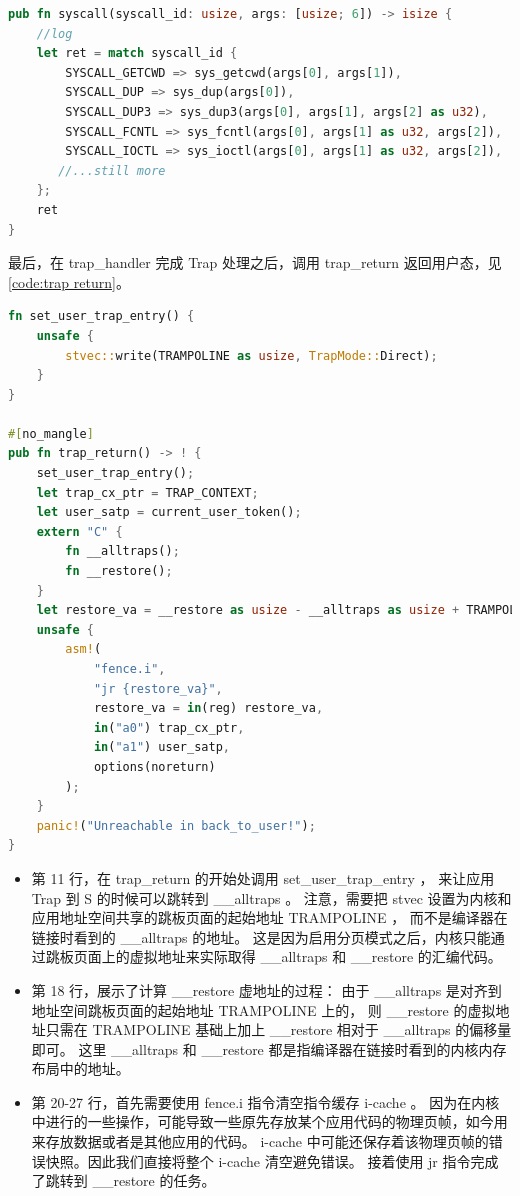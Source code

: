 \begin{lstlisting}[language={Rust}, label={code:syscall},
    caption={syscall}]
pub fn syscall(syscall_id: usize, args: [usize; 6]) -> isize {
	//log
    let ret = match syscall_id {
        SYSCALL_GETCWD => sys_getcwd(args[0], args[1]),
        SYSCALL_DUP => sys_dup(args[0]),
        SYSCALL_DUP3 => sys_dup3(args[0], args[1], args[2] as u32),
        SYSCALL_FCNTL => sys_fcntl(args[0], args[1] as u32, args[2]),
        SYSCALL_IOCTL => sys_ioctl(args[0], args[1] as u32, args[2]),
       //...still more
    };
    ret
}
\end{lstlisting}

最后，在 trap_handler 完成 Trap 处理之后，调用 trap_return 返回用户态，见\autoref{code:trap return}。

\begin{lstlisting}[language={Rust}, label={code:trap return},
    caption={trap_return}]
fn set_user_trap_entry() {
    unsafe {
        stvec::write(TRAMPOLINE as usize, TrapMode::Direct);
    }
}

#[no_mangle]
pub fn trap_return() -> ! {
    set_user_trap_entry();
    let trap_cx_ptr = TRAP_CONTEXT;
    let user_satp = current_user_token();
    extern "C" {
        fn __alltraps();
        fn __restore();
    }
    let restore_va = __restore as usize - __alltraps as usize + TRAMPOLINE;
    unsafe {
        asm!(
            "fence.i",
            "jr {restore_va}",
            restore_va = in(reg) restore_va,
            in("a0") trap_cx_ptr,
            in("a1") user_satp,
            options(noreturn)
        );
    }
    panic!("Unreachable in back_to_user!");
}
\end{lstlisting}

\begin{itemize}
    \item 第 11 行，在 trap_return 的开始处调用 set_user_trap_entry ，
    来让应用 Trap 到 S 的时候可以跳转到 __alltraps 。
    注意，需要把 stvec 设置为内核和应用地址空间共享的跳板页面的起始地址 TRAMPOLINE ，
    而不是编译器在链接时看到的 __alltraps 的地址。
    这是因为启用分页模式之后，内核只能通过跳板页面上的虚拟地址来实际取得 __alltraps 和 __restore 的汇编代码。

    \item 第 18 行，展示了计算 __restore 虚地址的过程：
    由于 __alltraps 是对齐到地址空间跳板页面的起始地址 TRAMPOLINE 上的， 
    则 __restore 的虚拟地址只需在 TRAMPOLINE 基础上加上 __restore 相对于 __alltraps 的偏移量即可。
    这里 __alltraps 和 __restore 都是指编译器在链接时看到的内核内存布局中的地址。

    \item 第 20-27 行，首先需要使用 fence.i 指令清空指令缓存 i-cache 。
    因为在内核中进行的一些操作，可能导致一些原先存放某个应用代码的物理页帧，如今用来存放数据或者是其他应用的代码。
    i-cache 中可能还保存着该物理页帧的错误快照。因此我们直接将整个 i-cache 清空避免错误。
    接着使用 jr 指令完成了跳转到 __restore 的任务。
\end{itemize}

